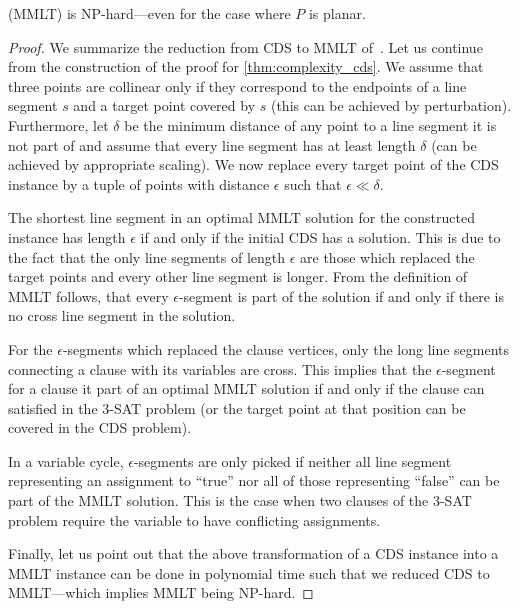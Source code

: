 \begin{theorem}
   (\gls{MMLT}) is NP-hard---even for the case
  where \(P\) is planar.
  \begin{proof}
  We summarize the reduction from \gls{CDS} to \gls{MMLT}
  of~\cite{mmlt_complexity}. Let us continue from the construction of
  the proof for \cref{thm:complexity_cds}. We assume that three points
  are collinear only if they correspond to the endpoints of a line
  segment \(s\) and a target point covered by \(s\) (this can be
  achieved by perturbation). Furthermore, let \(\delta\) be the
  minimum distance of any point to a line segment it is not part of
  and assume that every line segment has at least length \(\delta\)
  (can be achieved by appropriate scaling). We now replace every
  target point of the \gls{CDS} instance by a tuple of points with
  distance \(\epsilon\) such that \(\epsilon \ll \delta\).
  
  The shortest line segment in an optimal \gls{MMLT} solution for the
  constructed instance has length \(\epsilon\) if and only if the
  initial \gls{CDS} has a solution. This is due to the fact that the
  only line segments of length \(\epsilon\) are those which replaced
  the target points and every other line segment is longer. From the
  definition of \gls{MMLT} follows, that every \(\epsilon\)-segment
  is part of the solution if and only if there is no \gls{cross}
  line segment in the solution. 
  
  For the \(\epsilon\)-segments which
  replaced the clause vertices, only the long line segments connecting
  a clause with its variables are \gls{cross}. This implies that the
  \(\epsilon\)-segment for a clause it part of an optimal \gls{MMLT} 
  solution if and only if the clause can satisfied in the 3-SAT
  problem (or the target point at that position can be covered in the
  \gls{CDS} problem).
  
  In a variable cycle, \(\epsilon\)-segments are only picked if
  neither all line segment representing an assignment to ``true'' nor
  all of those representing ``false'' can be part of the \gls{MMLT}
  solution. This is the case when two clauses of the 3-SAT problem
  require the variable to have conflicting assignments.
  
  Finally, let us point out that the above transformation of a
  \gls{CDS} instance into a \gls{MMLT} instance can be done in
  polynomial time such that we reduced \gls{CDS} to \gls{MMLT}---which
  implies \gls{MMLT} being NP-hard.
  \end{proof}
\end{theorem}

